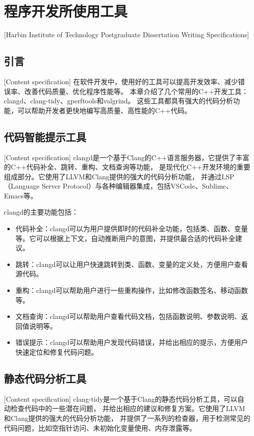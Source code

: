 

\chapter[程序开发使用工具]{程序开发所使用工具}[Harbin Institute of Technology Postgraduate Dissertation Writing Specifications]
\section{引言}[Content specification]
在软件开发中，使用好的工具可以提高开发效率、减少错误率、改善代码质量、优化程序性能等。
本章介绍了几个常用的C++开发工具：clangd、clang-tidy、gperftools和valgrind。
这些工具都具有强大的代码分析功能，可以帮助开发者更快地编写高质量、高性能的C++代码。



\section{代码智能提示工具}[Content specification]
clangd是一个基于Clang的C++语言服务器，它提供了丰富的C++代码补全、跳转、重构、文档查询等功能，
是现代化C++开发环境的重要组成部分。它使用了LLVM和Clang提供的强大的代码分析功能，
并通过LSP（Language Server Protocol）与各种编辑器集成，包括VSCode、Sublime、Emacs等。

clangd的主要功能包括：

\begin{itemize}[itemindent=2em]
\item 代码补全：clangd可以为用户提供即时的代码补全功能，包括类、函数、变量等。它可以根据上下文，自动推断用户的意图，并提供最合适的代码补全建议。

\item 跳转：clangd可以让用户快速跳转到类、函数、变量的定义处，方便用户查看源代码。

\item 重构：clangd可以帮助用户进行一些重构操作，比如修改函数签名、移动函数等。

\item 文档查询：clangd可以帮助用户查看代码文档，包括函数说明、参数说明、返回值说明等。

\item 错误提示：clangd可以帮助用户发现代码错误，并给出相应的提示，方便用户快速定位和修复代码问题。
\end{itemize}


\section{静态代码分析工具}[Content specification]
clang-tidy是一个基于Clang的静态代码分析工具，可以自动检查代码中的一些潜在问题，
并给出相应的建议和修复方案。它使用了LLVM和Clang提供的强大的代码分析功能，
并提供了一系列的检查器，用于检测常见的代码问题，比如空指针访问、未初始化变量使用、内存泄露等。

